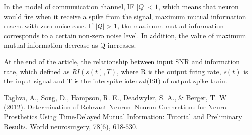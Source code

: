 \documentclass{article}[12pt]
\begin{document}
In the model of communication channel, IF $|Q|<1$, which means that neuron would fire when it receive a spike from the signal, maximum mutual information reachs with zero noise case. If $|Q|>1$, the maximum mutual information corresponds to a certain non-zero noise level. In addition, the value of maximum mutual information decrease as Q increases.

At the end of the article, the relationship between input SNR and information rate, which defined as $RI(s(t), T)$, where R is the output firing rate, $s(t)$ is the input signal and T is the interspike interval(ISI) of output spike train.

\begin{thebibliography}{0}
	Taghva, A., Song, D., Hampson, R. E., Deadwyler, S. A., \& Berger, T. W. (2012). Determination of Relevant Neuron–Neuron Connections for Neural Prosthetics Using Time-Delayed Mutual Information: Tutorial and Preliminary Results. World neurosurgery, 78(6), 618-630.
\end{thebibliography}
\end{document}
